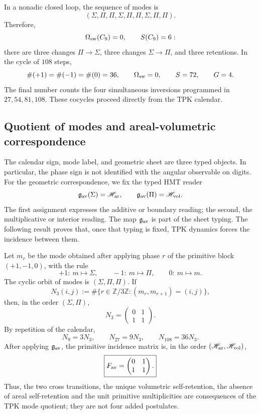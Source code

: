 In a nonadic closed loop, the sequence of modes is
\[
 (\Sigma,\Pi,\Pi,\Sigma,\Pi,\Pi,\Sigma,\Pi,\Pi).
\]
Therefore,
\[
 \Omega_{\rm sw}(C_9)=0,\qquad S(C_9)=6:
\]
there are three changes \(\Pi\to\Sigma\), three changes
\(\Sigma\to\Pi\), and three retentions. In the cycle of \(108\) steps,
\[
 \#(+1)=\#(-1)=\#(0)=36,\qquad
 \Omega_{\rm sw}=0,\qquad S=72,\qquad G=4.
\]
The final number counts the four simultaneous inversions programmed in
\(27,54,81,108\). These cocycles proceed directly from the TPK calendar\@.

\subsection{Quotient of modes and areal-volumetric correspondence}
\label{sec:cociente-modos-fav}

The calendar sign, mode label, and geometric sheet are three typed
objects. In particular, the phase sign is not identified with the
angular observable on digits. For the geometric correspondence, we fix the
typed HMT reader
\[
 \mathfrak g_{\rm av}(\Sigma)=\mathscr H_{\rm ar},
 \qquad
 \mathfrak g_{\rm av}(\Pi)=\mathscr H_{\rm vol}.
\]
The first assignment expresses the additive or boundary reading; the second, the
multiplicative or interior reading. The map \(\mathfrak g_{\rm av}\) is
part of the sheet typing. The following result proves that, once
that typing is fixed, TPK dynamics forces the incidence between them.

\begin{theorem}
\label{thm:descenso-necesario-fav}
Let \(m_r\) be the mode obtained after applying phase \(r\) of the
primitive block \((+1,-1,0)\), with the rule
\[
 +1:\ m\mapsto\Sigma,\qquad
 -1:\ m\mapsto\Pi,\qquad
 0:\ m\mapsto m.
\]
The cyclic orbit of modes is \((\Sigma,\Pi,\Pi)\). If
\[
 N_3(i,j)
 :=
 \#\{r\in\mathbb Z/3\mathbb Z:(m_r,m_{r+1})=(i,j)\},
\]
then, in the order \((\Sigma,\Pi)\),
\[
 \boxed{
 N_3=
 \begin{pmatrix}0&1\\1&1\end{pmatrix}.}
\]
By repetition of the calendar,
\[
 N_9=3N_3,\qquad N_{27}=9N_3,\qquad N_{108}=36N_3.
\]
After applying \(\mathfrak g_{\rm av}\), the primitive incidence
matrix is, in the order
\((\mathscr H_{\rm ar},\mathscr H_{\rm vol})\),
\[
 \boxed{
 F_{\rm av}=
 \begin{pmatrix}0&1\\1&1\end{pmatrix}.}
\]
Thus, the two cross transitions, the unique volumetric self-retention, the
absence of areal self-retention and the unit primitive multiplicities
are consequences of the TPK mode quotient; they are not four added
postulates.
\end{theorem}

